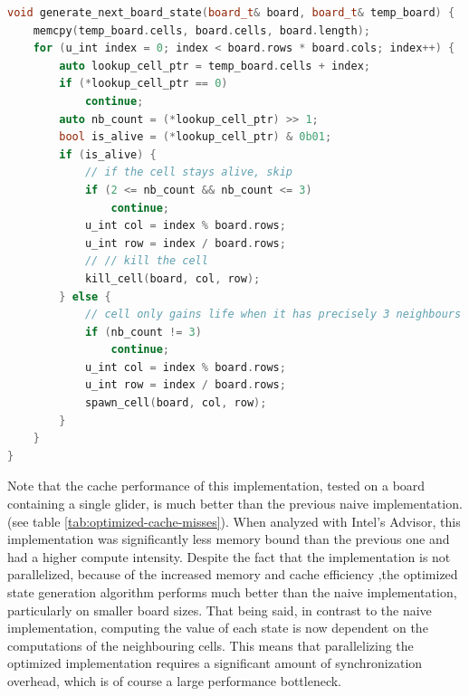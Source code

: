 \documentclass[a4paper,english,12pt,twoside=false]{scrartcl} %
\begin{document}
\begin{lstlisting}[caption={Parallel Naive State Generation Algorithm},label={lst:gol-optimized-algo},language=C++]
void generate_next_board_state(board_t& board, board_t& temp_board) {
    memcpy(temp_board.cells, board.cells, board.length);
    for (u_int index = 0; index < board.rows * board.cols; index++) {
        auto lookup_cell_ptr = temp_board.cells + index;
        if (*lookup_cell_ptr == 0)
            continue;
        auto nb_count = (*lookup_cell_ptr) >> 1;
        bool is_alive = (*lookup_cell_ptr) & 0b01;
        if (is_alive) {
            // if the cell stays alive, skip
            if (2 <= nb_count && nb_count <= 3)
                continue;
            u_int col = index % board.rows;
            u_int row = index / board.rows;
            // // kill the cell
            kill_cell(board, col, row);
        } else {
            // cell only gains life when it has precisely 3 neighbours
            if (nb_count != 3)
                continue;
            u_int col = index % board.rows;
            u_int row = index / board.rows;
            spawn_cell(board, col, row);
        }
    }
}
\end{lstlisting}

Note that the cache performance of this implementation, tested on a board containing a single glider, is much better than the previous naive implementation. (see table \ref{tab:optimized-cache-misses}). When analyzed with Intel's Advisor, this implementation was significantly less memory bound than the previous one and had a higher compute intensity. Despite the fact that the implementation is not parallelized, because of the increased memory and cache efficiency ,the optimized state generation algorithm performs much better than the naive implementation, particularly on smaller board sizes. That being said, in contrast to the naive implementation, computing the value of each state is now dependent on the computations of the neighbouring cells. This means that parallelizing the optimized implementation requires a significant amount of synchronization overhead, which is of course a large performance bottleneck. 
\end{document}
